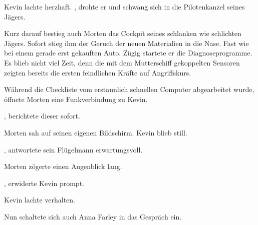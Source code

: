\par

Kevin lachte herzhaft. , drohte er und schwang sich in die Pilotenkanzel seines Jägers.

\par

Kurz darauf bestieg auch Morten das Cockpit seines schlanken wie schlichten Jägers. Sofort stieg ihm der Geruch der neuen Materialien in die Nase. Fast wie bei einem gerade erst gekauften Auto. Zügig startete er die Diagnoseprogramme. Es blieb nicht viel Zeit, denn die mit dem Mutterschiff gekoppelten Sensoren zeigten bereits die ersten feindlichen Kräfte auf Angriffskurs.

\par

Während die Checkliste vom erstaunlich schnellen Computer abgearbeitet wurde, öffnete Morten eine Funkverbindung zu Kevin.

\par

, berichtete dieser sofort. 

\par

Morten sah auf seinen eigenen Bildschirm.  Kevin blieb still. 

\par

, antwortete sein Flügelmann erwartungsvoll.

\par

Morten zögerte einen Augenblick lang. 

\par

, erwiderte Kevin prompt. 

\par


\par

Kevin lachte verhalten. 

\par

Nun schaltete sich auch Anna Farley in das Gespräch ein. 

